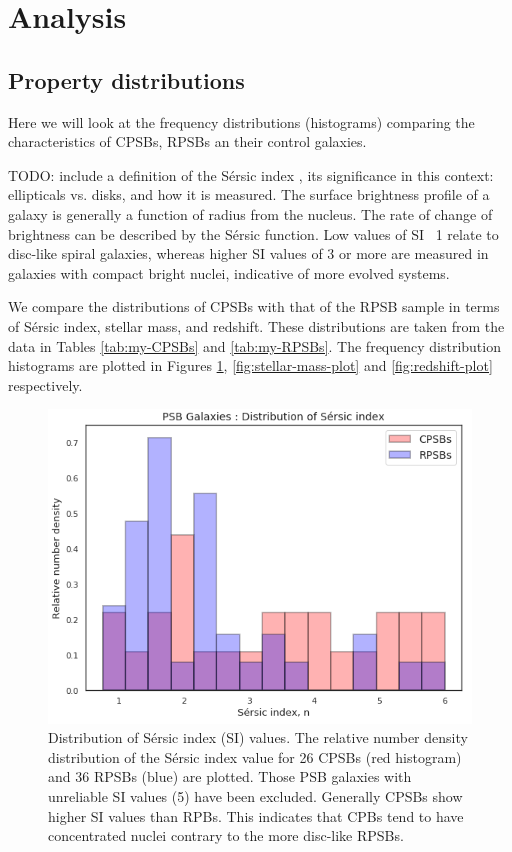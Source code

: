 \section{Analysis}
\label{sec:analysis}

\subsection{Property distributions}
Here we will look at the frequency distributions (histograms) comparing the characteristics of CPSBs, RPSBs an their control galaxies.

TODO: include a definition of the S\'ersic index \citep{1963BAAA....6...41S, 1968adga.book.....S}, its significance in this context: ellipticals vs. disks, and how it is measured. The surface brightness profile of a galaxy is generally a function of radius from the nucleus. The rate of change of brightness can be described by the S\'ersic function. Low values of SI ~1 relate to disc-like spiral galaxies, whereas higher SI values of 3 or more are measured in galaxies with compact bright nuclei, indicative of more evolved systems.  

We compare the distributions of CPSBs with that of the RPSB sample in terms of S\'ersic index, stellar mass, and redshift. These distributions are taken from the data in Tables \ref{tab:my-CPSBs} and \ref{tab:my-RPSBs}. The frequency distribution histograms are plotted in Figures \ref{fig:Sersic-plot}, \ref{fig:stellar-mass-plot} and \ref{fig:redshift-plot} respectively.

\begin{figure}
    \centering
    \includegraphics[width=\columnwidth]{images/JupyterPlots/Dist-Sersic-Index-All.png}
    \caption{Distribution of S\'ersic index (SI) values. The relative number density distribution of the S\'ersic index value for 26 CPSBs (red histogram) and 36 RPSBs (blue) are plotted. Those PSB galaxies with unreliable SI values (5) have been excluded. Generally CPSBs show higher SI values than RPBs. This indicates that CPBs tend to have concentrated nuclei contrary to the more disc-like RPSBs.}
    \label{fig:Sersic-plot}
\end{figure}

